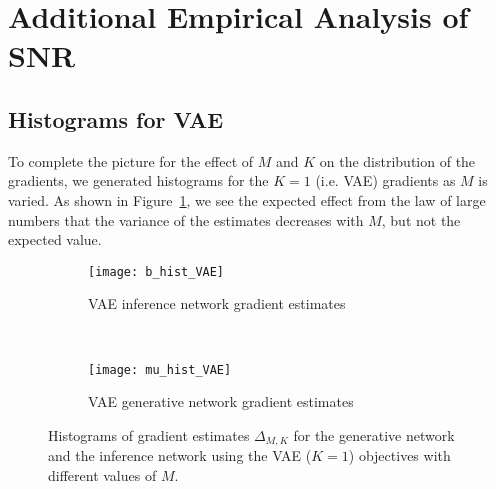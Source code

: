 
\section{Additional Empirical Analysis of SNR}
\label{sec:app:emp}

\subsection{Histograms for VAE}
\label{sec:hist-vae}

To complete the picture for the effect of $M$ and $K$ on the distribution
of the gradients, we generated histograms for the $K=1$ (i.e. \gls{VAE})
gradients as $M$ is varied.  As shown in Figure~\ref{fig:snr/b_hist_vae},
we see the expected effect from the law of large numbers that the 
variance of the estimates decreases with $M$, but not the expected value.

\begin{figure*}[h]
	\centering
		\begin{subfigure}[b]{0.45\textwidth}
			\centering
			\texttt{[image: b\_hist\_VAE]}
			\caption{\gls{VAE} inference network gradient estimates \label{fig:snr/b_hist_vae}}
		\end{subfigure} ~~~~~~~~~~
		\begin{subfigure}[b]{0.45\textwidth}
			\centering
			\texttt{[image: mu\_hist\_VAE]}
			\caption{\gls{VAE} generative network gradient estimates \label{fig:snr/mu_hist_vae}}
		\end{subfigure}
	\caption{Histograms of gradient estimates $\Delta_{M,K}$ for the generative network and 
		the	inference network using the \gls{VAE} ($K=1$) objectives with different values of $M$. \vspace{-12pt}
		\label{fig:snr/hists-vae}}
\end{figure*}

